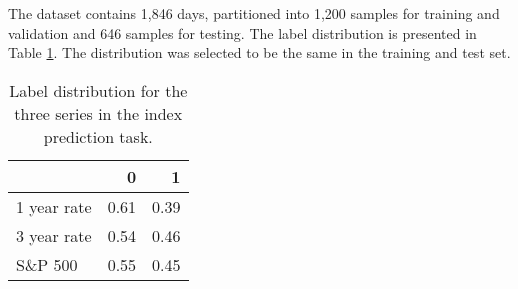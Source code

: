 The dataset contains 1,846 days, partitioned into 1,200 samples for training and validation and 646 samples for testing. The label distribution is presented in Table \ref{tab:label_dist1}. The distribution was selected to be the same in the training and test set. 

\begin{table}[h]
    \centering
    \begin{tabular}{lrr}
        & \textbf{0} & \textbf{1} \\
        \hline \hline 
        1 year rate & 0.61 & 0.39 \\
        3 year rate & 0.54 & 0.46 \\
        S\&P 500 & 0.55 & 0.45 \\
        \hline 
    \end{tabular}
    \caption{Label distribution for the three series in the index prediction task. }
    \label{tab:label_dist1}
\end{table}

